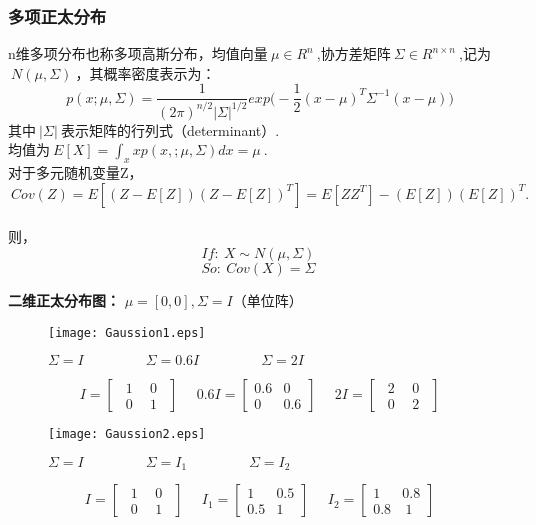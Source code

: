 \subsubsection{多项正太分布}
n维多项分布也称多项高斯分布，均值向量$~\mu\in R^n~$,协方差矩阵$~\Sigma\in R^{n\times n}~$,记为$~N(\mu,\Sigma)~$，其概率密度表示为：$$p(x;\mu,\Sigma)=\frac{1}{(2\pi)^{n/2}|\Sigma|^{1/2}}exp\Big(-\frac{1}{2}(x-\mu)^T\Sigma^{-1}(x-\mu)\Big)$$
其中$~|\Sigma|~$表示矩阵的行列式（determinant）.\\
均值为$~E[X]=\displaystyle \int_xxp(x,;\mu,\Sigma)dx=\mu~$.\\
对于多元随机变量Z，$$~Cov(Z)=E[(Z-E[Z])(Z-E[Z])^T]=E[ZZ^T]-(E[Z])(E[Z])^T.~$$\\
则，$$If:~X\sim N(\mu,\Sigma)~$$$$So:~Cov(X)=\Sigma~$$

\noindent\textbf{二维正太分布图：} $\mu=[0,0],\Sigma=I$（单位阵）
\begin{figure}[!h]
  \centering
  \texttt{[image: Gaussion1.eps]}
  \caption{$\Sigma=I~~~~~~~~~~~~~~~~~~~~\Sigma=0.6I~~~~~~~~~~~~~~~~~~~~\Sigma=2I$}
\end{figure}

$$I=\begin{bmatrix}
      ~~1~ & ~0~~ \\
      ~~0~ & ~1~~
    \end{bmatrix}~~~~~~0.6I=\begin{bmatrix}
                      0.6 & 0 \\
                      0 & 0.6
                    \end{bmatrix}~~~~~~2I=\begin{bmatrix}
                                           ~~ 2~ & ~0~~ \\
                                           ~~ 0~ & ~2~~
                                          \end{bmatrix}$$

\begin{figure}[!h]
  \centering
  \texttt{[image: Gaussion2.eps]}
  \caption{$\Sigma=I~~~~~~~~~~~~~~~~~~~~\Sigma=I_1~~~~~~~~~~~~~~~~~~~~\Sigma=I_2$}
\end{figure}
$$I=\begin{bmatrix}
      ~~1~ & ~0~~ \\
      ~~0~ & ~1~~
    \end{bmatrix}~~~~~~I_1=\begin{bmatrix}
                      1 & 0.5 \\
                      0.5 & 1
                    \end{bmatrix}~~~~~~I_2=\begin{bmatrix}
                                            1 & 0.8 \\
                                            0.8 & ~1
                                          \end{bmatrix}$$

